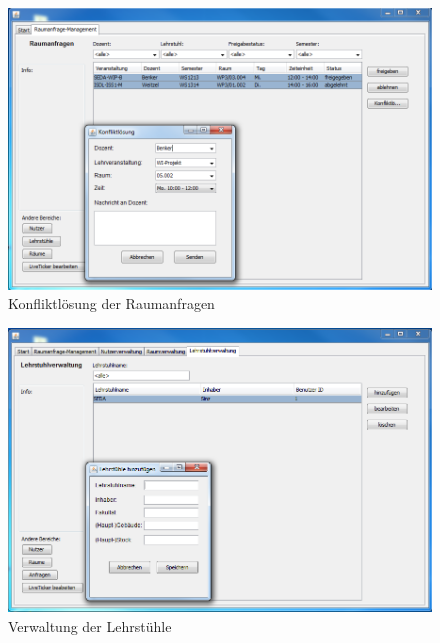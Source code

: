 \begin{figure}[H]
\begin{center}
\includegraphics[width=150mm]{images/section_7/VerwaltungRaumanfragen.PNG}
\caption{Konfliktlösung der Raumanfragen}
\label{img:KonfliktlösungVerwaltung}
\end{center}
\end{figure}

\begin{figure}[H]
\begin{center}
\includegraphics[width=150mm]{images/section_7/VerwaltungLehrstuhlverwaltung.PNG}
\caption{Verwaltung der Lehrstühle}
\label{img:LehrstuhlVerw}
\end{center}
\end{figure}

